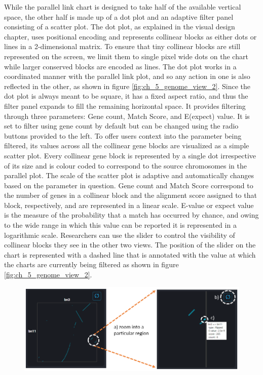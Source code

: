 While the parallel link chart is designed to take half of the available vertical space, the other half is made up of a dot plot and an adaptive filter panel consisting of a scatter plot. The dot plot, as explained in the visual design chapter, uses positional encoding and represents collinear blocks as either dots or lines in a 2-dimensional matrix. To ensure that tiny collinear blocks are still represented on the screen, we limit them to single pixel wide dots on the chart while larger conserved blocks are encoded as lines. The dot plot works in a coordinated manner with the parallel link plot, and so any action in one is also reflected in the other, as shown in figure \ref{fig:ch_5_genome_view_2}. Since the dot plot is always meant to be square, it has a fixed aspect ratio, and thus the filter panel expands to fill the remaining horizontal space. It provides filtering through three parameters: Gene count, Match Score, and E(expect) value. It is set to filter using gene count by default but can be changed using the radio buttons provided to the left. To offer users context into the parameter being filtered, its values across all the collinear gene blocks are visualized as a simple scatter plot. Every collinear gene block is represented by a single dot irrespective of its size and is colour coded to correspond to the source chromosomes in the parallel plot. The scale of the scatter plot is adaptive and automatically changes based on the parameter in question. Gene count and Match Score correspond to the number of genes in a collinear block and the alignment score assigned to that block, respectively, and are represented in a linear scale. E-value or expect value is the measure of the probability that a match has occurred by chance, and owing to the wide range in which this value can be reported it is represented in a logarithmic scale. Researchers can use the slider to control the visibility of collinear blocks they see in the other two views. The position of the slider on the chart is represented with a dashed line that is annotated with the value at which the charts are currently being filtered as shown in figure \ref{fig:ch_5_genome_view_2}.


\begin{figure}[h]
  \centering
  \includegraphics[width=.95\linewidth]{images/ch_5_chromosome_view.PNG}
  \label{fig:ch_5_chromosome_view}
\end{figure} 

